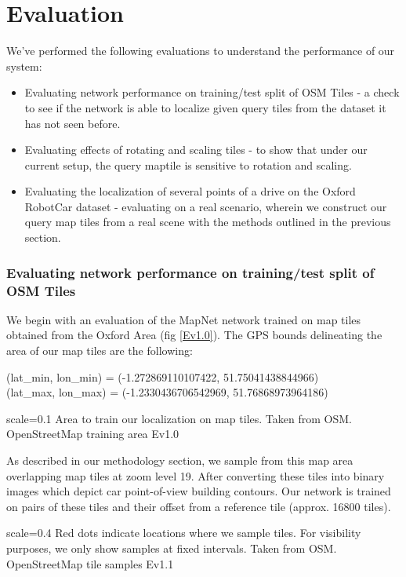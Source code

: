 
\chapter{Evaluation}
We've performed the following evaluations to understand the performance of our system:
\begin{itemize}	
\item Evaluating network performance on training/test split of OSM Tiles - a check to see if the network is able to localize given query tiles from the dataset it has not seen before. \\
\item Evaluating effects of rotating and scaling tiles - to show that under our current setup, the query maptile is sensitive to rotation and scaling.\\
\item Evaluating the localization of several points of a drive on the Oxford RobotCar dataset - evaluating on a real scenario, wherein we construct our query map tiles from a real scene with the methods outlined in the previous section. 
\end{itemize}
\subsection{Evaluating network performance on training/test split of OSM Tiles}
We begin with an evaluation of the MapNet network trained on map tiles obtained from the Oxford Area (fig \ref{Ev1.0}). The GPS bounds delineating the area of our map tiles are the following:

(lat\_min, lon\_min) = (-1.272869110107422, 51.75041438844966)\\
(lat\_max, lon\_max) = (-1.2330436706542969, 51.76868973964186)

{scale=0.1}%
{Area to train our localization on map tiles. Taken from OSM.}%
{OpenStreetMap training area}%
{Ev1.0}

As described in our methodology section, we sample from this map area overlapping map tiles at zoom level 19. After converting these tiles into binary images which depict car point-of-view building contours. Our network is trained on pairs of these tiles and their offset from a reference tile (approx. 16800 tiles).

{scale=0.4}%
{Red dots indicate locations where we sample tiles. For visibility purposes, we only show samples at fixed intervals. Taken from OSM.}%
{OpenStreetMap tile samples}%
{Ev1.1}

